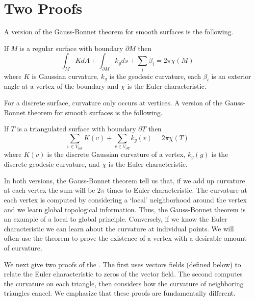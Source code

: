 \section{Two Proofs}



A version of the Gauss-Bonnet theorem for smooth surfaces is the following.

\begin{theorem} \label{thm:g-b-c}

If $M$ is a regular surface with boundary $\partial M$ then
	$$\int_{M} K dA+ \int_{\partial M} k_g ds + \sum_i \beta_i= 2\pi \chi(M)$$
	where  $K$ is Gaussian curvature,
	 $k_g$ is the geodesic curvature,
	 each $\beta_i$  is an exterior angle at a vertex of the boundary and
	$\chi$ is the Euler characteristic.
\end{theorem}

For a discrete surface, curvature only occurs at vertices.
A version of the Gauss-Bonnet theorem for smooth surfaces is the following.

\begin{theorem} \label{thm:g-b-d}

If $T$ is a triangulated surface with  boundary $\partial T$ then
$$\sum_{v\in V_{int}} K(v) + \sum_{v\in V_{\partial T}} k_g(v) = 2\pi \chi(T)$$
where $K(v)$ is the discrete Gaussian curvature
of a vertex, $k_g(g)$ is the discrete geodesic curvature,  and
$\chi$ is the Euler characteristic.
\end{theorem}

In both versions, the Gauss-Bonnet theorem tell us that, if we add up curvature
at each vertex the sum will be $2\pi$ times to Euler characteristic.
The curvature at each vertex is computed by considering a `local' neighborhood
around the vertex and we learn global topological information. Thus, the Gauss-Bonnet 
theorem is an example of a local to global principle. 
Conversely, if we know the Euler characteristic we can learn about the curvature
at individual points. We will often use the theorem to prove the existence of
a vertex with a desirable amount of curvature.

We next give two proofs of the . The first uses vectors fields (defined below)
to relate the Euler characteristic to zeros of the vector field. The second computes
the curvature on each triangle, then considers how the curvature of neighboring triangles
cancel. We emphasize that these proofs are fundamentally different.

